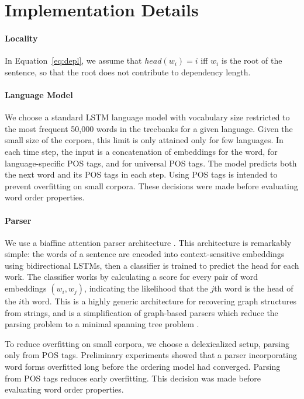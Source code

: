 \documentclass[12pt]{article}
\begin{document}
\section{Implementation Details}

\paragraph{Locality}
In Equation~\ref{eq:depl}, we assume that $head(w_i) = i$ iff $w_i$ is the root of the sentence, so that the root does not contribute to dependency length.

\paragraph{Language Model}
We choose a standard LSTM \citep{hochreiter1997long} language model with vocabulary size restricted to the most frequent 50,000 words in the treebanks for a given language.
Given the small size of the corpora, this limit is only attained only for few languages.
In each time step, the input is a concatenation of embeddings for the word, for language-specific POS tags, and for universal POS tags.
The model predicts both the next word and its POS tags in each step.
Using POS tags is intended to prevent overfitting on small corpora.
These decisions were made before evaluating word order properties.

\paragraph{Parser}
We use a biaffine attention parser architecture \citep{kiperwasser2016simple,zhang2017dependency,dozat2017stanford}. This architecture is remarkably simple: the words of a sentence are encoded into context-sensitive embeddings using bidirectional LSTMs, then a classifier is trained to predict the head for each work. The classifier works by calculating a score for every pair of word embeddings $(w_i, w_j)$, indicating the likelihood that the $j$th word is the head of the $i$th word. This is a highly generic architecture for recovering graph structures from strings, and is a simplification of graph-based parsers which reduce the parsing problem to a minimal spanning tree problem \citep{mcdonald2005nonprojective}.

To reduce overfitting on small corpora, we choose a delexicalized setup, parsing only from POS tags. Preliminary experiments showed that a parser incorporating word forms overfitted long before the ordering model had converged. Parsing from POS tags reduces early overfitting.
This decision was made before evaluating word order properties.
\end{document}
